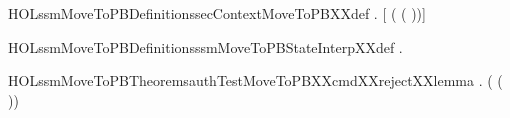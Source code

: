 \newcommand{\HOLssmMoveToPBDate}{10 June 2018}
\newcommand{\HOLssmMoveToPBTime}{18:23}
\begin{SaveVerbatim}{HOLssmMoveToPBDefinitionssecContextMoveToPBXXdef}
\HOLTokenTurnstile{} \HOLSymConst{\HOLTokenForall{}}.
       \HOLSymConst{=}
     [    ( ( ))]
\end{SaveVerbatim}
\newcommand{\HOLssmMoveToPBDefinitionssecContextMoveToPBXXdef}{\UseVerbatim{HOLssmMoveToPBDefinitionssecContextMoveToPBXXdef}}
\begin{SaveVerbatim}{HOLssmMoveToPBDefinitionsssmMoveToPBStateInterpXXdef}
\HOLTokenTurnstile{} \HOLSymConst{\HOLTokenForall{}}.   \HOLSymConst{=} 
\end{SaveVerbatim}
\newcommand{\HOLssmMoveToPBDefinitionsssmMoveToPBStateInterpXXdef}{\UseVerbatim{HOLssmMoveToPBDefinitionsssmMoveToPBStateInterpXXdef}}
\newcommand{\HOLssmMoveToPBDefinitions}{
\HOLDfnTag{ssmMoveToPB}{secContextMoveToPB_def}\HOLssmMoveToPBDefinitionssecContextMoveToPBXXdef
\HOLDfnTag{ssmMoveToPB}{ssmMoveToPBStateInterp_def}\HOLssmMoveToPBDefinitionsssmMoveToPBStateInterpXXdef
}
\begin{SaveVerbatim}{HOLssmMoveToPBTheoremsauthTestMoveToPBXXcmdXXrejectXXlemma}
\HOLTokenTurnstile{} \HOLSymConst{\HOLTokenForall{}}. \HOLSymConst{\HOLTokenNeg{}} ( ( ))
\end{SaveVerbatim}
\newcommand{\HOLssmMoveToPBTheoremsauthTestMoveToPBXXcmdXXrejectXXlemma}{\UseVerbatim{HOLssmMoveToPBTheoremsauthTestMoveToPBXXcmdXXrejectXXlemma}}
